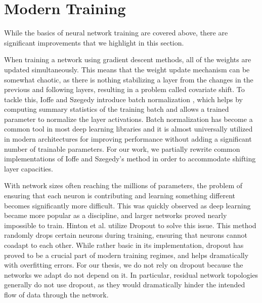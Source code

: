 \section{Modern Training}
While the basics of neural network training are covered above, there are significant improvements that we highlight in this section. 

When training a network using gradient descent methods, all of the weights are updated simultaneously.
This means that the weight update mechanism can be somewhat chaotic, as there is nothing stabilizing a layer from the changes in the previous and following layers, resulting in a problem called covariate shift.
To tackle this, Ioffe and Szegedy introduce batch normalization \cite{ioffe2015batch}, which helps by computing summary statistics of the training batch and allows a trained parameter to normalize the layer activations.
Batch normalization has become a common tool in most deep learning libraries and it is almost universally utilized in modern architectures for improving performance without adding a significant number of trainable parameters.
For our work, we partially rewrite common implementations of Ioffe and Szegedy's method in order to accommodate shifting layer capacities.

With network sizes often reaching the millions of parameters, the problem of ensuring that each neuron is contributing and learning something different becomes significantly more difficult.
This was quickly observed as deep learning became more popular as a discipline, and larger networks proved nearly impossible to train.
Hinton et al. utilize Dropout \cite{hinton2012improving, srivastava2014dropout} to solve this issue.
This method randomly drops certain neurons during training, ensuring that neurons cannot coadapt to each other.
While rather basic in its implementation, dropout has proved to be a crucial part of modern training regimes, and helps dramatically with overfitting errors.
For our thesis, we do not rely on dropout because the networks we adapt do not depend on it.
In particular, residual network topologies generally do not use dropout, as they would dramatically hinder the intended flow of data through the network.

